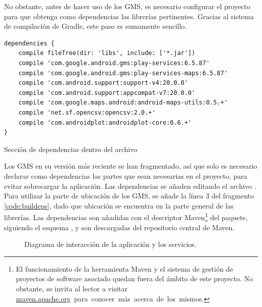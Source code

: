 No obstante, antes de hacer uso de los \ac{GMS}, es necesario configurar el proyecto para que obtenga como dependencias las librerías pertinentes. Gracias al sistema de compilación de Gradle, este paso es sumamente sencillo. 
\begin{listing}[h] 
\begin{verbatim}
dependencies {
    compile fileTree(dir: 'libs', include: ['*.jar'])
    compile 'com.google.android.gms:play-services:6.5.87'
    compile 'com.google.android.gms:play-services-maps:6.5.87'
    compile 'com.android.support:support-v4:20.0.0'
    compile 'com.android.support:appcompat-v7:20.0.0'
    compile 'com.google.maps.android:android-maps-utils:0.5.+'
    compile 'net.sf.opencsv:opencsv:2.0.+'
    compile 'com.androidplot:androidplot-core:0.6.+'
}
\end{verbatim}
\caption{Sección de dependencias dentro del archivo }
\label{code:buildeps}
\end{listing}

Los \ac{GMS} en su versión más reciente se han fragmentado, así que solo es necesario declarar como dependencias las partes que sean necesarias en el proyecto, para evitar sobrecargar la aplicación. Las dependencias se añaden editando el archivo . Para utilizar la parte de ubicación de los GMS, se añade la línea 3 del fragmento \ref{code:buildeps}, dado que ubicación se encuentra en la parte general de las librerías. Las dependencias son añadidas con el descriptor Maven\footnote{El funcionamiento de la herramienta Maven y el sistema de gestión de proyectos de software asociado quedan fuera del ámbito de este proyecto. No obstante, se invita al lector a visitar \mbox{\url{maven.apache.org} para conocer más acerca de los mismos.}} del paquete, siguiendo el esquema , y son descargadas del repositorio central de Maven.

\begin{figure}[h] \centering
{}
\caption{Diagrama de interacción de la aplicación y los servicios.}\label{fig:diagrama:servicios}
\end{figure}

